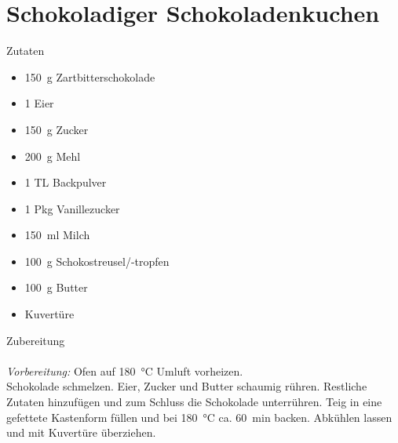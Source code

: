 \section*{Schokoladiger Schokoladenkuchen}
\ihead{}\ohead{}
\cfoot{}
{\Large Zutaten}
\begin{multicols}{2}
\begin{itemize}
    \item \SI{150}{g} Zartbitterschokolade
    \item \num{1} Eier
    \item \SI{150}{g} Zucker
    \item \SI{200}{g} Mehl
    \item \num{1} TL Backpulver
    \item \num{1} Pkg Vanillezucker
    \item \SI{150}{ml} Milch
    \item \SI{100}{g} Schokostreusel/-tropfen
    \item \SI{100}{g} Butter
    \item Kuvertüre
\end{itemize}
\end{multicols}
\noindent
{\Large Zubereitung}\\
\\
\textit{Vorbereitung:} Ofen auf \SI{180}{\celsius} Umluft vorheizen.\\
Schokolade schmelzen. 
Eier, Zucker und Butter schaumig rühren. 
Restliche Zutaten hinzufügen und zum Schluss die Schokolade unterrühren.
Teig in eine gefettete Kastenform füllen und bei \SI{180}{\celsius} ca. \SI{60}{min} backen.
Abkühlen lassen und mit Kuvertüre überziehen.
